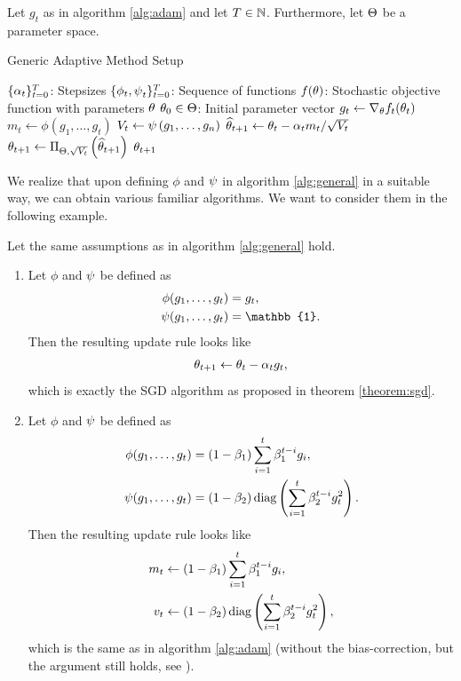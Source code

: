 \begin{algorithm}[H]
Let $g_t$ as in algorithm \ref{alg:adam} and let $T\in\operatorname{\mathbb{N}}$. Furthermore, let $\operatorname{\Theta}$ be a parameter space.
\caption{Generic Adaptive Method Setup}\label{alg:general}
\begin{algorithmic}[1]
\Require $\{\alpha_t\}_{t=0}^T$: Stepsizes
\Require $\{\phi_t, \operatorname{\psi}_t\}_{t=0}^T$: Sequence of functions
\Require $f(\theta)$: Stochastic objective function with parameters $\theta$
\Require $\theta_0\in\operatorname{\Theta}$: Initial parameter vector
	\State $g_t \gets \nabla_{\theta}f_t(\theta_{t})$ 
	\State $m_t \gets \phi\left(g_1,\ldots,g_t \right)$ 
	\State $V_t \gets \operatorname{\psi}\left(g_1,\ldots,g_n\right)$ 
	\State $\widehat{\theta}_{t+1} \gets \theta_t - \alpha_t m_t/\sqrt{V_t}$ 
	\State $\theta_{t+1} \gets \Pi_{\operatorname{\Theta},\sqrt{V_t}}\left(\widehat{\theta}_{t+1} \right)$ 
\EndFor
\State \Return $\theta_{t+1}$ 
\end{algorithmic}
\end{algorithm}

We realize that upon defining $\phi$ and $\operatorname{\psi}$ in algorithm \ref{alg:general} in a suitable way, we can obtain various familiar algorithms. We want to consider them in the following example.

\begin{example}
Let the same assumptions as in algorithm \ref{alg:general} hold.
\begin{enumerate}
\item Let $\phi$ and $\operatorname{\psi}$ be defined as
\begin{align*}
\phi(g_1,\ldots, g_t) &= g_t,\\
\p(g_1,\ldots, g_t) &= \mathbb{1}.
\end{align*}
Then the resulting update rule looks like
\begin{align*}
\theta_{t+1} \gets \theta_t - \alpha_t g_t,
\end{align*}
which is exactly the SGD algorithm as proposed in theorem \ref{theorem:sgd}.
\item Let $\phi$ and $\operatorname{\psi}$ be defined as
\begin{align*}
\phi(g_1,\ldots, g_t) &= (1-\beta_1)\sum_{i=1}^t\beta_1^{t-i}g_i,\\
\operatorname{\psi}(g_1,\ldots, g_t) &= (1-\beta_2)\operatorname{\text{diag}}\left(\sum_{i=1}^t\beta_2^{t-i}g_t^2\right).
\end{align*}
Then the resulting update rule looks like
\begin{align*}
m_t &\gets (1-\beta_1)\sum_{i=1}^t\beta_1^{t-i}g_i,\\
v_t &\gets (1-\beta_2)\operatorname{\text{diag}}\left(\sum_{i=1}^t\beta_2^{t-i}g_t^2\right),
\end{align*}
which is the same as in algorithm \ref{alg:adam} (without the bias-correction, but the argument still holds, see \cite{reddi2019convergence}).
\end{enumerate}
\end{example}

